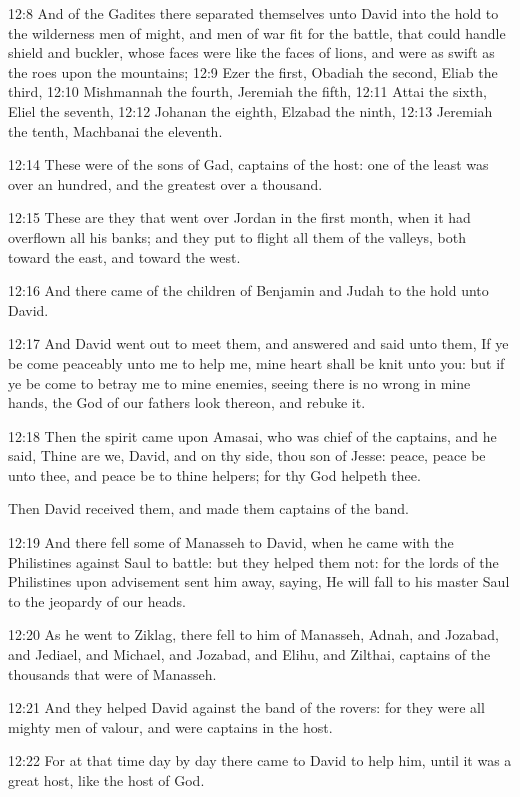 12:8 And of the Gadites there separated themselves unto David into the
hold to the wilderness men of might, and men of war fit for the
battle, that could handle shield and buckler, whose faces were like
the faces of lions, and were as swift as the roes upon the mountains;
12:9 Ezer the first, Obadiah the second, Eliab the third, 12:10
Mishmannah the fourth, Jeremiah the fifth, 12:11 Attai the sixth,
Eliel the seventh, 12:12 Johanan the eighth, Elzabad the ninth, 12:13
Jeremiah the tenth, Machbanai the eleventh.

12:14 These were of the sons of Gad, captains of the host: one of the
least was over an hundred, and the greatest over a thousand.

12:15 These are they that went over Jordan in the first month, when it
had overflown all his banks; and they put to flight all them of the
valleys, both toward the east, and toward the west.

12:16 And there came of the children of Benjamin and Judah to the hold
unto David.

12:17 And David went out to meet them, and answered and said unto
them, If ye be come peaceably unto me to help me, mine heart shall be
knit unto you: but if ye be come to betray me to mine enemies, seeing
there is no wrong in mine hands, the God of our fathers look thereon,
and rebuke it.

12:18 Then the spirit came upon Amasai, who was chief of the captains,
and he said, Thine are we, David, and on thy side, thou son of Jesse:
peace, peace be unto thee, and peace be to thine helpers; for thy God
helpeth thee.

Then David received them, and made them captains of the band.

12:19 And there fell some of Manasseh to David, when he came with the
Philistines against Saul to battle: but they helped them not: for the
lords of the Philistines upon advisement sent him away, saying, He
will fall to his master Saul to the jeopardy of our heads.

12:20 As he went to Ziklag, there fell to him of Manasseh, Adnah, and
Jozabad, and Jediael, and Michael, and Jozabad, and Elihu, and
Zilthai, captains of the thousands that were of Manasseh.

12:21 And they helped David against the band of the rovers: for they
were all mighty men of valour, and were captains in the host.

12:22 For at that time day by day there came to David to help him,
until it was a great host, like the host of God.

